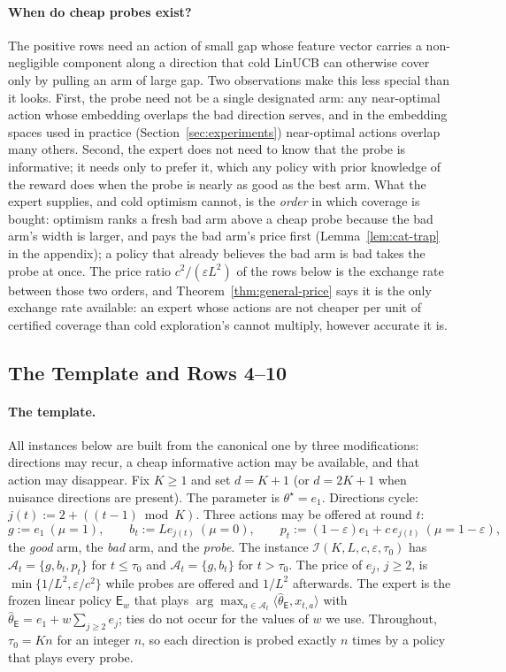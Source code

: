 \documentclass{article}
\theoremstyle{definition}
\theoremstyle{remark}
\newcommand{\eps}{\varepsilon}
\theoremstyle{remark}
\newcommand{\Exp}{\mathsf{E}}
\begin{document}
\paragraph{When do cheap probes exist?}
The positive rows need an action of small gap whose feature vector carries a
non-negligible component along a direction that cold LinUCB can otherwise
cover only by pulling an arm of large gap. Two observations make this less
special than it looks. First, the probe need not be a single designated arm:
any near-optimal action whose embedding overlaps the bad direction serves,
and in the embedding spaces used in practice (Section~\ref{sec:experiments})
near-optimal actions overlap many others. Second, the expert does not need to
know that the probe is informative; it needs only to prefer it, which any
policy with prior knowledge of the reward does when the probe is nearly as
good as the best arm. What the expert supplies, and cold optimism cannot, is
the \emph{order} in which coverage is bought: optimism ranks a fresh bad arm
above a cheap probe because the bad arm's width is larger, and pays the bad
arm's price first (Lemma~\ref{lem:cat-trap} in the appendix); a policy that
already believes the bad arm is bad takes the probe at once. The price ratio
$c^2/(\eps L^2)$ of the rows below is the exchange rate between those two
orders, and Theorem~\ref{thm:general-price} says it is the only exchange rate
available: an expert whose actions are not cheaper per unit of certified
coverage than cold exploration's cannot multiply, however accurate it is.

\subsection{The Template and Rows 4--10}
\label{sec:template}


\paragraph{The template.}
All instances below are built from the canonical one by three modifications:
directions may recur, a cheap informative action may be available, and that
action may disappear. Fix $K\ge1$ and set $d=K+1$ (or $d=2K+1$ when nuisance
directions are present). The parameter is $\theta^\star=e_1$. Directions
cycle: $j(t):=2+((t-1)\bmod K)$. Three actions may be offered at round $t$:
\[
g:=e_1\ (\mu=1),\qquad
b_t:=Le_{j(t)}\ (\mu=0),\qquad
p_t:=(1-\eps)e_1+c\,e_{j(t)}\ (\mu=1-\eps),
\]
the \emph{good} arm, the \emph{bad} arm, and the \emph{probe}. The instance
$\mathcal I(K,L,c,\eps,\tau_0)$ has $\mathcal A_t=\{g,b_t,p_t\}$ for $t\le\tau_0$
and $\mathcal A_t=\{g,b_t\}$ for $t>\tau_0$. The price of $e_j$, $j\ge2$, is
$\min\{1/L^2,\eps/c^2\}$ while probes are offered and $1/L^2$ afterwards. The
expert is the frozen linear policy $\Exp_w$ that plays
$\arg\max_{a\in\mathcal A_t}\langle\widehat\theta_{\Exp},x_{t,a}\rangle$ with
$\widehat\theta_{\Exp}=e_1+w\sum_{j\ge2}e_j$; ties do not occur for the values
of $w$ we use. Throughout, $\tau_0=Kn$ for an integer $n$, so each direction is
probed exactly $n$ times by a policy that plays every probe.
\end{document}
